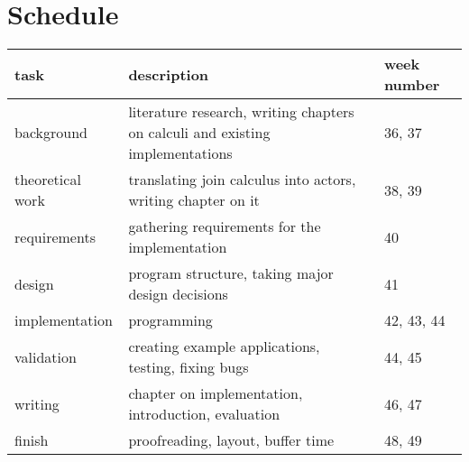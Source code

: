 \documentclass[12pt]{article}
\begin{document}
\section*{Schedule}

\begin{tabular}{| p{3cm} | p{7cm} | p{2.45cm} |}
  \hline
    task &
    description &
    week number \\
  \hline
    background &
    literature research, writing chapters on calculi and existing implementations &
    36, 37 \\
  \hline
    theoretical work &
    translating join calculus into actors, writing chapter on it &
    38, 39 \\
  \hline
    requirements &
    gathering requirements for the implementation &
    40 \\
  \hline
    design &
    program structure, taking major design decisions &
    41 \\
  \hline
    implementation &
    programming &
    42, 43, 44 \\
  \hline
    validation &
    creating example applications, testing, fixing bugs &
    44, 45 \\
  \hline
    writing &
    chapter on implementation, introduction, evaluation &
    46, 47 \\
  \hline
    finish &
    proofreading, layout, buffer time &
    48, 49 \\
  \hline
\end{tabular}

\nocite{levy_results_1997}
\nocite{maranget_compiling_1998}

\pagebreak
{}

\end{document}
